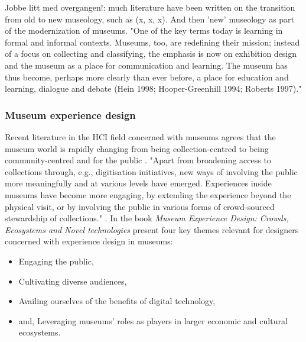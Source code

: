 \par
Jobbe litt med overgangen!: much literature have been written on the transition from old to new museology, such as (x, x, x). And then 'new' museology as part of the modernization of museums.
"One of the key terms today is learning in formal and informal contexts. Museums, too, are redefining their mission; instead of a focus on collecting and classifying, the emphasis is now on exhibition design and the museum as a place for communication and learning. The museum has thus become, perhaps more clearly than ever before, a place for education and learning, dialogue and debate (Hein 1998; Hooper-Greenhill 1994; Roberts 1997)." \autocite[]{insulander selander design for learning in museum context}


\subsubsection{Museum experience design}
Recent literature in the HCI field concerned with museums agrees that the museum world is rapidly changing from being collection-centred to being community-centred and for the public \autocite[p. 1]{vermeeren_museum_2018}. "Apart from broadening access to collections through, e.g., digitisation initiatives, new ways of involving the public more meaningfully and at various levels have emerged. Experiences inside museums have become more engaging, by extending the experience beyond the physical visit, or by involving the public in various forms of crowd-sourced stewardship of collections." \autocite[p. 1]{vermeeren_museum_2018}. In the book \emph{Museum Experience Design: Crowds, Ecosystems and Novel technologies} \autocite{vermeeren_museum_2018} present four key themes relevant for designers concerned with experience design in museums: 
\begin{itemize}
    \item Engaging the public,
    \item Cultivating diverse audiences,
    \item Availing ourselves of the benefits of digital technology,
    \item and, Leveraging museums’ roles as players in larger economic and cultural ecosystems.
\end{itemize}

